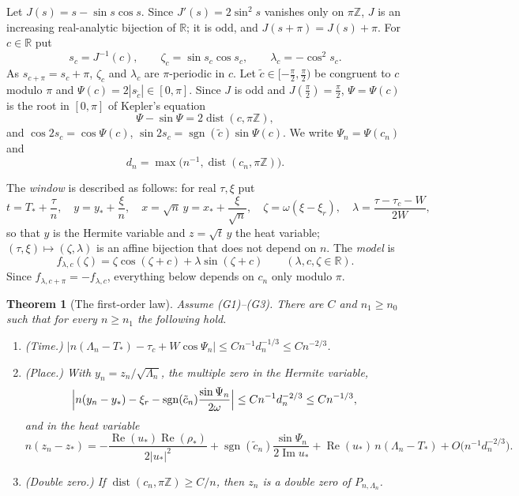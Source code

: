 \documentclass[11pt]{amsart}
\newtheorem{theorem}{Theorem}[section]
\theoremstyle{definition}
\theoremstyle{remark}
\numberwithin{equation}{section}
\newcommand{\R}{\mathbb{R}}
\newcommand{\Z}{\mathbb{Z}}
\DeclareMathOperator{\re}{Re}
\DeclareMathOperator{\im}{Im}
\DeclareMathOperator{\dist}{dist}
\begin{document}
Let $J(s)=s-\sin s\cos s$. Since $J'(s)=2\sin^2s$ vanishes only on $\pi\Z$, $J$ is an increasing real-analytic
bijection of $\R$; it is odd, and $J(s+\pi)=J(s)+\pi$. For $c\in\R$ put
\[
s_c=J^{-1}(c),\qquad \zeta_c=\sin s_c\cos s_c,\qquad \lambda_c=-\cos^2s_c .
\]
As $s_{c+\pi}=s_c+\pi$, $\zeta_c$ and $\lambda_c$ are $\pi$-periodic in $c$. Let $\tilde c\in[-\frac\pi2,\frac\pi2)$
be congruent to $c$ modulo $\pi$ and $\Psi(c)=2|s_{\tilde c}|\in[0,\pi]$. Since $J$ is odd and $J(\frac\pi2)=\frac\pi2$,
$\Psi=\Psi(c)$ is the root in $[0,\pi]$ of Kepler's equation
\begin{equation}\label{eq:kepler}
\Psi-\sin\Psi=2\dist(c,\pi\Z),
\end{equation}
and $\cos2s_c=\cos\Psi(c)$, $\sin2s_c=\operatorname{sgn}(\tilde c)\sin\Psi(c)$. We write $\Psi_n=\Psi(c_n)$ and
\[
d_n=\max\bigl(n^{-1},\dist(c_n,\pi\Z)\bigr).
\]

The \emph{window} is described as follows: for real $\tau,\xi$ put
\begin{equation}\label{eq:window}
t=T_*+\frac\tau n,\quad y=y_*+\frac\xi n,\quad x=\sqrt n\,y=x_*+\frac\xi{\sqrt n},\quad
\zeta=\omega(\xi-\xi_r),\quad \lambda=\frac{\tau-\tau_c-W}{2W},
\end{equation}
so that $y$ is the Hermite variable and $z=\sqrt t\,y$ the heat variable; $(\tau,\xi)\mapsto(\zeta,\lambda)$ is an affine
bijection that does not depend on $n$. The \emph{model} is
\begin{equation}\label{eq:model}
f_{\lambda,c}(\zeta)=\zeta\cos(\zeta+c)+\lambda\sin(\zeta+c)\qquad(\lambda,c,\zeta\in\R).
\end{equation}
Since $f_{\lambda,c+\pi}=-f_{\lambda,c}$, everything below depends on $c_n$ only modulo $\pi$.

\begin{theorem}[The first-order law]\label{thm:firstorder}
Assume (G1)--(G3). There are $C$ and $n_1\ge n_0$ such that for every $n\ge n_1$ the following hold.
\begin{enumerate}
\item[(a)] \emph{(Time.)} $\bigl|n(\Lambda_n-T_*)-\tau_c+W\cos\Psi_n\bigr|\le Cn^{-1}d_n^{-1/3}\le Cn^{-2/3}$.
\item[(b)] \emph{(Place.)} With $y_n=z_n/\sqrt{\Lambda_n}$, the multiple zero in the Hermite variable,
\[
\Bigl|n(y_n-y_*)-\xi_r-\operatorname{sgn}(\tilde c_n)\frac{\sin\Psi_n}{2\omega}\Bigr|\le Cn^{-1}d_n^{-2/3}\le Cn^{-1/3},
\]
and in the heat variable
\[
n(z_n-z_*)=-\frac{\re(u_*)\re(\rho_*)}{2|u_*|^2}+\operatorname{sgn}(\tilde c_n)\frac{\sin\Psi_n}{2\im u_*}
+\re(u_*)\,n(\Lambda_n-T_*)+O\bigl(n^{-1}d_n^{-2/3}\bigr).
\]
\item[(c)] \emph{(Double zero.)} If $\dist(c_n,\pi\Z)\ge C/n$, then $z_n$ is a double zero of $P_{n,\Lambda_n}$.
\end{enumerate}
\end{theorem}
\end{document}
